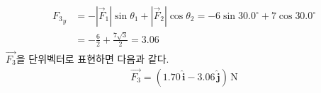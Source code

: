 \documentclass[floatfix,nofootinbib,superscriptaddress,fleqn,preprint]{revtex4}
\begin{document}
\begin{itemize}
\begin{align}
\begin{split}
      {F_3}_y&=-|\vec{F}_1|\sin{\theta_1}+|\vec{F}_2|\cos{\theta_2}
      =-6\sin{30.0^\circ}+7\cos{30.0^\circ}   \\
      &=-\frac{6}{2}+\frac{7\sqrt{3}}{2} = 3.06
    \end{split}
  \end{align}
  $\vec{F_3}$을 단위벡터로 표현하면 다음과 같다.
  \begin{align}\label{eq:2}
    \vec{F_3}=(1.70\,\hat{\bm{i}} -
    3.06\,\hat{\bm{j}})\,\mathrm{N}
  \end{align}

\end{itemize}
\end{document}
